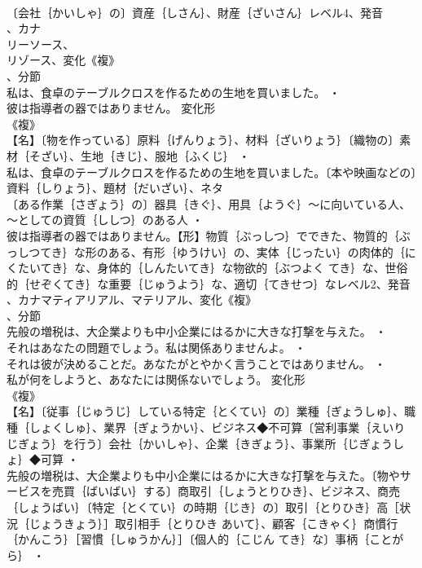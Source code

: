 \documentclass[8pt]{extreport}
\begin{document}
\begin{CJK}{UTF8}{min}
\\	〔会社｛かいしゃ｝の〕資産｛しさん｝、財産｛ざいさん｝レベル4、発音
\\	、カナ
\\	リーソース、
\\	リゾース、変化《複》
\\	、分節
\\	私は、食卓のテーブルクロスを作るための生地を買いました。 ・
\\	彼は指導者の器ではありません。	変化形 
\\	《複》
\\	【名】〔物を作っている〕原料｛げんりょう｝、材料｛ざいりょう｝〔織物の〕素材｛そざい｝、生地｛きじ｝、服地｛ふくじ｝ ・
\\	私は、食卓のテーブルクロスを作るための生地を買いました。〔本や映画などの〕資料｛しりょう｝、題材｛だいざい｝、ネタ
\\	〔ある作業｛さぎょう｝の〕器具｛きぐ｝、用具｛ようぐ｝～に向いている人、～としての資質｛ししつ｝のある人 ・
\\	彼は指導者の器ではありません。【形】物質｛ぶっしつ｝でできた、物質的｛ぶっしつてき｝な形のある、有形｛ゆうけい｝の、実体｛じったい｝の肉体的｛にくたいてき｝な、身体的｛しんたいてき｝な物欲的｛ぶつよく てき｝な、世俗的｛せぞくてき｝な重要｛じゅうよう｝な、適切｛てきせつ｝なレベル2、発音
\\	、カナマティアリアル、マテリアル、変化《複》
\\	、分節
\\	先般の増税は、大企業よりも中小企業にはるかに大きな打撃を与えた。 ・
\\	それはあなたの問題でしょう。私は関係ありませんよ。 ・
\\	それは彼が決めることだ。あなたがとやかく言うことではありません。 ・
\\	私が何をしようと、あなたには関係ないでしょう。	変化形 
\\	《複》
\\	【名】〔従事｛じゅうじ｝している特定｛とくてい｝の〕業種｛ぎょうしゅ｝、職種｛しょくしゅ｝、業界｛ぎょうかい｝、ビジネス◆不可算〔営利事業｛えいり じぎょう｝を行う〕会社｛かいしゃ｝、企業｛きぎょう｝、事業所｛じぎょうしょ｝◆可算 ・
\\	先般の増税は、大企業よりも中小企業にはるかに大きな打撃を与えた。〔物やサービスを売買｛ばいばい｝する〕商取引｛しょうとりひき｝、ビジネス、商売｛しょうばい｝〔特定｛とくてい｝の時期｛じき｝の〕取引｛とりひき｝高［状況｛じょうきょう｝］取引相手｛とりひき あいて｝、顧客｛こきゃく｝商慣行｛かんこう｝［習慣｛しゅうかん｝］〔個人的｛こじん てき｝な〕事柄｛ことがら｝ ・

\end{CJK}
\end{document}
